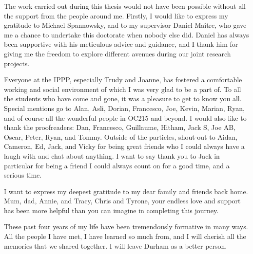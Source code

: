 \documentclass[twoside,openright,frontopenright]{ip3thesis}
\begin{document}
\begin{acknowledgements*}
%
	The work carried out during this thesis would not have been
	possible without all the support from the people around me.
	Firstly, I would like to express my gratitude to Michael Spannowsky, and
	to my supervisor Daniel Ma\^{i}tre, who gave me a chance to undertake this
	doctorate when nobody else did.
	Daniel has always been supportive with his meticulous advice and guidance,
	and I thank him for giving me the freedom to explore different avenues during our joint research projects.
	
	Everyone at the IPPP, especially Trudy and Joanne, has fostered a comfortable working
	and social environment of which I was very glad to be a part of.
	To all the students who have come and gone, it was a pleasure
	to get to know you all. Special mentions go to Alan, Asli, Dorian, Francesco, Joe, Kevin, Marian,
	Ryan, and of course all the wonderful people in OC215 and beyond. I would also like to thank
	the proofreaders: Dan, Francesco, Guillaume, Hitham, Jack S, Joe AB, Oscar, Peter, Ryan, and Tommy.
	Outside of the particles, shout-out to Aidan, Cameron, Ed, Jack, and Vicky for being great friends
	who I could always have a laugh with and chat about anything. I want to say thank you to Jack
	in particular for being a friend I could always count on for a good time, and a serious time.
	
	I want to express my deepest gratitude to my dear family and friends back home. Mum, dad, Annie,
	and Tracy, Chris and Tyrone, your endless love and support has been more helpful than you can imagine
	in completing this journey.

	These past four years of my life have been tremendously formative in many ways. All the people
	I have met, I have learned so much from, and I will cherish all
	the memories that we shared together. I will leave Durham as a better person.
%
\end{acknowledgements*}

\cleardoublepage










\appendix


%



\end{document}

